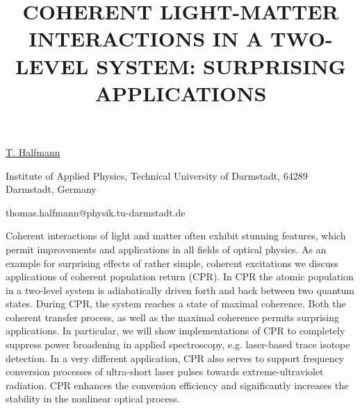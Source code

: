 \title{COHERENT LIGHT-MATTER INTERACTIONS IN A TWO-LEVEL SYSTEM: SURPRISING APPLICATIONS}

\underline{T. Halfmann} 

{\normalsize{\vspace{-4mm}
Institute of Applied Physics, Technical University of Darmstadt,
64289 Darmstadt, Germany

\email thomas.halfmann@physik.tu-darmstadt.de}}

Coherent interactions of light and matter often exhibit stunning features, which permit improvements and applications in all fields of optical physics. As an example for surprising effects of rather simple, coherent excitations we discuss applications of coherent population return (CPR). In CPR the atomic population in a two-level system is adiabatically driven forth and back between two quantum states. During CPR, the system reaches a state of maximal coherence. Both the coherent transfer process, as well as the maximal coherence permits surprising applications. In particular, we will show implementations of CPR to completely suppress power broadening in applied spectroscopy, e.g. laser-based trace isotope detection. In a very different application, CPR also serves to support frequency conversion processes of ultra-short laser pulses towards extreme-ultraviolet radiation. CPR enhances the conversion efficiency and significantly increases the stability in the nonlinear optical process.

\vspace{\baselineskip} 